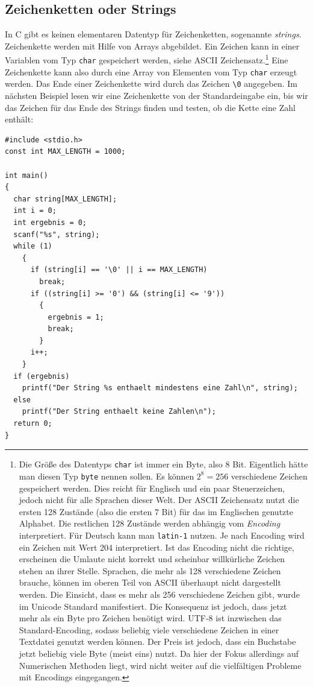 \subsection{Zeichenketten oder Strings}

In C gibt es keinen elementaren Datentyp für Zeichenketten, sogenannte \emph{strings}.
Zeichenkette werden mit Hilfe von Arrays abgebildet.
Ein Zeichen kann in einer Variablen vom Typ \verb|char| gespeichert werden, siehe ASCII Zeichensatz.\footnote{%
    Die Größe des Datentyps \texttt{char} ist immer ein Byte, also 8 Bit.
    Eigentlich hätte man diesen Typ \texttt{byte} nennen sollen. Es können $2^8
    = 256$ verschiedene Zeichen gespeichert werden. Dies reicht für Englisch
    und ein paar Steuerzeichen, jedoch nicht für alle Sprachen dieser Welt. Der
    ASCII Zeichensatz nutzt die ersten 128 Zustände (also die ersten 7 Bit) für
    das im Englischen genutzte Alphabet. Die restlichen 128 Zustände werden
    abhängig vom  \emph{Encoding} interpretiert. Für Deutsch kann man
    \texttt{latin-1} nutzen. Je nach Encoding wird ein Zeichen mit Wert 204
    interpretiert. Ist das Encoding nicht die richtige, erscheinen die Umlaute
    nicht korrekt und scheinbar willkürliche Zeichen stehen an ihrer Stelle.
    Sprachen, die mehr als 128 verschiedene Zeichen brauche, können im oberen
    Teil von ASCII überhaupt nicht dargestellt werden. Die Einsicht, dass es
    mehr als 256 verschiedene Zeichen gibt, wurde im Unicode Standard
    manifestiert. Die Konsequenz ist jedoch, dass jetzt mehr als ein Byte pro
    Zeichen benötigt wird. UTF-8 ist inzwischen das Standard-Encoding, sodass
    beliebig viele verschiedene Zeichen in einer Textdatei genutzt werden
    können. Der Preis ist jedoch, dass ein Buchstabe jetzt beliebig viele Byte
    (meist eins) nutzt. Da hier der Fokus allerdings auf Numerischen Methoden
    liegt, wird nicht weiter auf die vielfältigen Probleme mit Encodings
    eingegangen.
}
Eine Zeichenkette kann also durch eine Array von Elementen vom Typ \verb|char| erzeugt werden.
Das Ende einer Zeichenkette wird durch das Zeichen \verb|\0| angegeben.
Im nächsten Beispiel lesen wir eine Zeichenkette von der Standardeingabe ein, bis wir das Zeichen für das Ende des Strings finden und testen, ob die Kette eine Zahl enthält:
\begin{lstlisting}
#include <stdio.h>
const int MAX_LENGTH = 1000;

int main()
{
  char string[MAX_LENGTH];
  int i = 0;
  int ergebnis = 0;
  scanf("%s", string);
  while (1)
    {
      if (string[i] == '\0' || i == MAX_LENGTH)
        break;
      if ((string[i] >= '0') && (string[i] <= '9'))
        {
          ergebnis = 1;
          break;
        }
      i++;
    }
  if (ergebnis)
    printf("Der String %s enthaelt mindestens eine Zahl\n", string);
  else
    printf("Der String enthaelt keine Zahlen\n");
  return 0;
}
\end{lstlisting}
